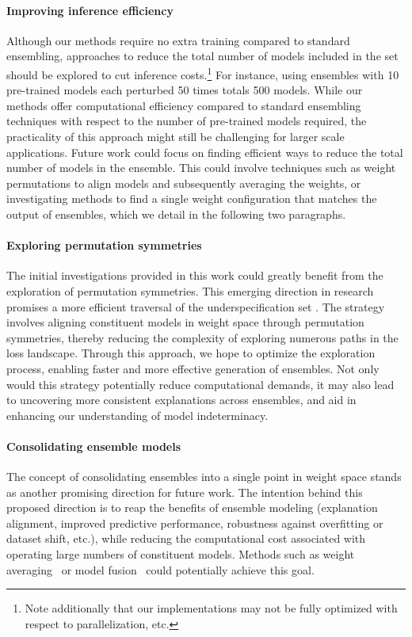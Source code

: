 \paragraph{Improving inference efficiency} Although our methods require no extra training compared to standard ensembling, approaches to reduce the total number of models included in the set should be explored to cut inference costs.\footnote{Note additionally that our implementations may not be fully optimized with respect to parallelization, etc.} For instance, using ensembles with 10 pre-trained models each perturbed 50 times totals 500 models. While our methods offer computational efficiency compared to standard ensembling techniques with respect to the number of pre-trained models required, the practicality of this approach might still be challenging for larger scale applications. Future work could focus on finding efficient ways to reduce the total number of models in the ensemble. This could involve techniques such as weight permutations to align models and subsequently averaging the weights, or investigating methods to find a single weight configuration that matches the output of ensembles, which we detail in the following two paragraphs.

\paragraph{Exploring permutation symmetries} The initial investigations provided in this work could greatly benefit from the exploration of permutation symmetries. This emerging direction in research promises a more efficient traversal of the underspecification set \citep{ainsworth2023, singh2020, tatro2020}. The strategy involves aligning constituent models in weight space through permutation symmetries, thereby reducing the complexity of exploring numerous paths in the loss landscape. Through this approach, we hope to optimize the exploration process, enabling faster and more effective generation of ensembles. Not only would this strategy potentially reduce computational demands, it may also lead to uncovering more consistent explanations across ensembles, and aid in enhancing our understanding of model indeterminacy.

\paragraph{Consolidating ensemble models} The concept of consolidating ensembles into a single point in weight space stands as another promising direction for future work. The intention behind this proposed direction is to reap the benefits of ensemble modeling (explanation alignment, improved predictive performance, robustness against overfitting or dataset shift, etc.), while reducing the computational cost associated with operating large numbers of constituent models. Methods such as weight averaging~\citep{izmailov2018} or model fusion~\citep{singh2020} could potentially achieve this goal.


